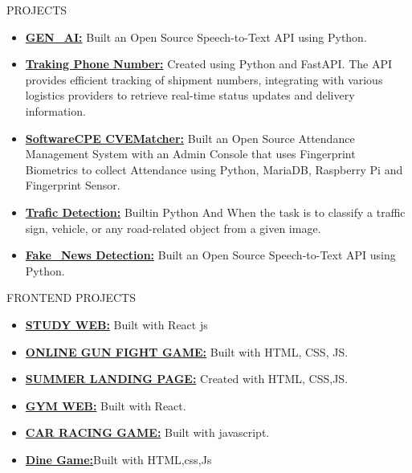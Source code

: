 \documentclass{resume}
\begin{document}
\begin{rSection}{PROJECTS}
    \begin{itemize}
        \item \textbf{\href{https://github.com/trishaamandal/Gen-AI}{GEN\_AI:}} {Built an Open Source Speech-to-Text API using Python.}
        \item \textbf{\href{https://github.com/trishaamandal/tracking_number}{Traking Phone Number:}} {Created using Python and FastAPI. The API provides efficient tracking of shipment numbers, integrating with various logistics providers to retrieve real-time status updates and delivery information.}
        \item \textbf{\href{https://github.com/trishaamandal/SoftwareCPE-CVE}{SoftwareCPE CVEMatcher:}} {Built an Open Source Attendance Management System with an Admin Console that uses Fingerprint Biometrics to collect Attendance using Python, MariaDB, Raspberry Pi and Fingerprint Sensor.}
        \item \textbf{\href{https://github.com/trishaamandal/Trafic_Detection}{Trafic Detection:}} {Builtin Python And When the task is to classify a traffic sign, vehicle, or any road-related object from a given image.}
        \item \textbf{\href{https://github.com/trishaamandal/fakenews_detection}{Fake\_News Detection:}} {Built an Open Source Speech-to-Text API using Python.}

    \end{itemize}
\end{rSection}
\vspace{-0.4em}

\begin{rSection}{ FRONTEND PROJECTS}
    \begin{itemize}
        \item \textbf{\href{https://github.com/trishaamandal/CD-studiesPlans}{STUDY WEB:}} {Built with React js}
        \item \textbf{\href{https://github.com/trishaamandal/gameweb}{ONLINE GUN FIGHT GAME:}} { Built with HTML, CSS, JS.}
        \item \textbf{\href{https://github.com/trishaamandal/landingpage_summer}{SUMMER LANDING PAGE:}} {Created with HTML, CSS,JS.}
        \item \textbf{\href{https://github.com/trishaamandal/GYM-group}{GYM WEB:}} {Built with React.}
        \item \textbf{\href{https://github.com/trishaamandal/car_racing}{CAR RACING GAME:}} {Built with javascript.}
        \item \textbf{\href{https://github.com/trishaamandal/Dine_game}{Dine Game:}}{Built with HTML,css,Js}

    \end{itemize}
\end{rSection}
\vspace{-0.4em}
\end{document}
